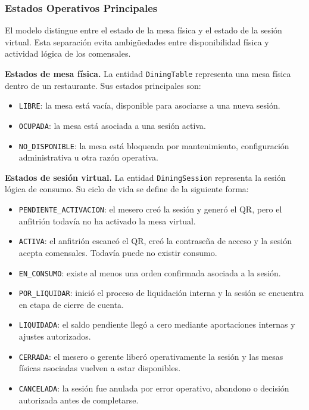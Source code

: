 \subsubsection{Estados Operativos Principales}

El modelo distingue entre el estado de la mesa física y el estado de la sesión virtual.
Esta separación evita ambigüedades entre disponibilidad física y actividad lógica de los
comensales.

\noindent\textbf{Estados de mesa física.}
La entidad \texttt{DiningTable} representa una mesa física dentro de un restaurante. Sus
estados principales son:

\begin{itemize}
  \item \texttt{LIBRE}: la mesa está vacía, disponible para asociarse a una nueva sesión.
  \item \texttt{OCUPADA}: la mesa está asociada a una sesión activa.
  \item \texttt{NO\_DISPONIBLE}: la mesa está bloqueada por mantenimiento, configuración
  administrativa u otra razón operativa.
\end{itemize}

\noindent\textbf{Estados de sesión virtual.}
La entidad \texttt{DiningSession} representa la sesión lógica de consumo. Su ciclo de vida
se define de la siguiente forma:

\begin{itemize}
  \item \texttt{PENDIENTE\_ACTIVACION}: el mesero creó la sesión y generó el QR, pero el
  anfitrión todavía no ha activado la mesa virtual.

  \item \texttt{ACTIVA}: el anfitrión escaneó el QR, creó la contraseña de acceso y la
  sesión acepta comensales. Todavía puede no existir consumo.

  \item \texttt{EN\_CONSUMO}: existe al menos una orden confirmada asociada a la sesión.

  \item \texttt{POR\_LIQUIDAR}: inició el proceso de liquidación interna y la sesión se
  encuentra en etapa de cierre de cuenta.

  \item \texttt{LIQUIDADA}: el saldo pendiente llegó a cero mediante aportaciones internas
  y ajustes autorizados.

  \item \texttt{CERRADA}: el mesero o gerente liberó operativamente la sesión y las mesas
  físicas asociadas vuelven a estar disponibles.

  \item \texttt{CANCELADA}: la sesión fue anulada por error operativo, abandono o decisión
  autorizada antes de completarse.
\end{itemize}

